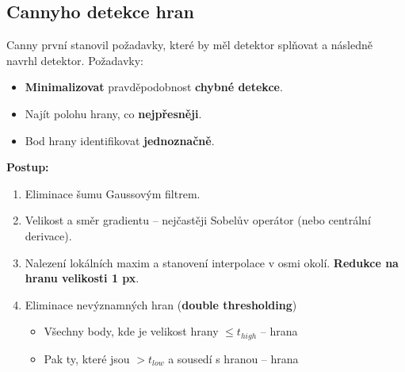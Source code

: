\subsection{Cannyho detekce hran}
Canny první stanovil požadavky, které by měl detektor splňovat a následně navrhl detektor. %
Požadavky:
\begin{itemize}
    \item \textbf{Minimalizovat} pravděpodobnost \textbf{chybné detekce}.
    \item Najít polohu hrany, co \textbf{nejpřesněji}.
    \item Bod hrany identifikovat \textbf{jednoznačně}.
\end{itemize}
\textbf{Postup:}
\begin{enumerate}
    \item Eliminace šumu Gaussovým filtrem.
    \item Velikost a směr gradientu -- nejčastěji Sobelův operátor (nebo centrální derivace).
    \item Nalezení lokálních maxim a stanovení interpolace v osmi okolí. \textbf{Redukce na hranu velikosti 1 px}.
    \item Eliminace nevýznamných hran (\textbf{double thresholding})
          \begin{itemize}
              \item Všechny body, kde je velikost hrany $\leq t_{high}$ --  hrana
              \item Pak ty, které jsou $ > t_{low}$ a sousedí s hranou --  hrana
          \end{itemize}
\end{enumerate}